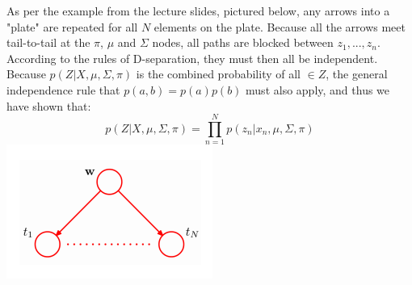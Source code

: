 As per the example from the lecture slides, pictured below, any arrows into a "plate" are repeated for all $N$ elements on the plate. Because all the arrows meet tail-to-tail at the $\pi$, $\mu$ and $\Sigma$ nodes, all paths are blocked between $z_1,...,z_n$. According to the rules of D-separation, they must then all be independent. Because $p(Z|X,\mu,\Sigma,\pi)$ is the combined probability of all $\in Z$, the general independence rule that $p(a,b) = p(a)p(b)$ must also apply, and thus we have shown that: $$p(Z|X,\mu,\Sigma,\pi) = \prod_{n=1}^N p(z_n|x_n, \mu, \Sigma, \pi)$$
\includegraphics[width=0.5\linewidth]{plate.png}
